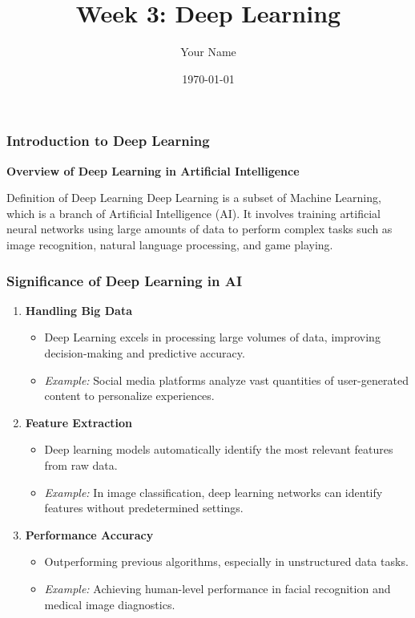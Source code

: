 \documentclass{beamer}
\title{Week 3: Deep Learning}
\author{Your Name}
\institute{Your Institution}
\date{\today}
\begin{document}
\frame{\titlepage}

\begin{frame}[fragile]
    \frametitle{Introduction to Deep Learning}
    \textbf{Overview of Deep Learning in Artificial Intelligence}
    
    \begin{block}{Definition of Deep Learning}
        Deep Learning is a subset of Machine Learning, which is a branch of Artificial Intelligence (AI). It involves training artificial neural networks using large amounts of data to perform complex tasks such as image recognition, natural language processing, and game playing.
    \end{block}
\end{frame}

\begin{frame}[fragile]
    \frametitle{Significance of Deep Learning in AI}
    
    \begin{enumerate}
        \item \textbf{Handling Big Data}
        \begin{itemize}
            \item Deep Learning excels in processing large volumes of data, improving decision-making and predictive accuracy.
            \item \textit{Example:} Social media platforms analyze vast quantities of user-generated content to personalize experiences.
        \end{itemize}
        
        \item \textbf{Feature Extraction}
        \begin{itemize}
            \item Deep learning models automatically identify the most relevant features from raw data.
            \item \textit{Example:} In image classification, deep learning networks can identify features without predetermined settings.
        \end{itemize}
        
        \item \textbf{Performance Accuracy}
        \begin{itemize}
            \item Outperforming previous algorithms, especially in unstructured data tasks.
            \item \textit{Example:} Achieving human-level performance in facial recognition and medical image diagnostics.
        \end{itemize}
    \end{enumerate}
\end{frame}
\end{document}
